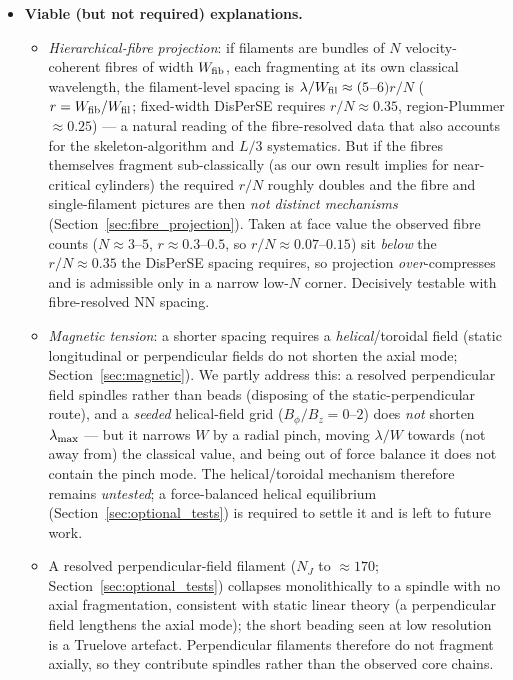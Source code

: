 \documentclass[usenatbib,twoside,twocolumn]{mnras}
\begin{document}
\begin{itemize}
    \item \textbf{Viable (but not required) explanations.}
    \begin{itemize}
        \item \emph{Hierarchical-fibre projection}: if filaments are bundles of $N$ velocity-coherent fibres of width $W_{\rm fib}$, each fragmenting at its own classical wavelength, the filament-level spacing is $\lambda/W_{\rm fil}\approx(5$--$6)r/N$ ($r=W_{\rm fib}/W_{\rm fil}$; fixed-width DisPerSE requires $r/N\approx0.35$, region-Plummer $\approx0.25$) --- a natural reading of the fibre-resolved data \citep{Yang2024,Hacar2013} that also accounts for the skeleton-algorithm and $L/3$ systematics. But if the fibres themselves fragment sub-classically (as our own result implies for near-critical cylinders) the required $r/N$ roughly doubles and the fibre and single-filament pictures are then \emph{not distinct mechanisms} (Section~\ref{sec:fibre_projection}). Taken at face value the observed fibre counts ($N\approx3$--$5$, $r\approx0.3$--$0.5$, so $r/N\approx0.07$--$0.15$) sit \emph{below} the $r/N\approx0.35$ the DisPerSE spacing requires, so projection \emph{over}-compresses and is admissible only in a narrow low-$N$ corner. Decisively testable with fibre-resolved NN spacing.
        \item \emph{Magnetic tension}: a shorter spacing requires a \emph{helical}/toroidal field \citep{Fiege2000} (static longitudinal or perpendicular fields do not shorten the axial mode; Section~\ref{sec:magnetic}). We partly address this: a resolved perpendicular field spindles rather than beads (disposing of the static-perpendicular route), and a \emph{seeded} helical-field grid ($B_\phi/B_z=0$--$2$) does \emph{not} shorten $\lambda_{\rm max}$ --- but it narrows $W$ by a radial pinch, moving $\lambda/W$ towards (not away from) the classical value, and being out of force balance it does not contain the \citet{Fiege2000} pinch mode. The helical/toroidal mechanism therefore remains \emph{untested}; a force-balanced helical equilibrium (Section~\ref{sec:optional_tests}) is required to settle it and is left to future work.
        \item A resolved perpendicular-field filament ($N_J$ to $\approx170$; Section~\ref{sec:optional_tests}) collapses monolithically to a spindle with no axial fragmentation, consistent with static linear theory (a perpendicular field lengthens the axial mode); the short beading seen at low resolution is a Truelove artefact. Perpendicular filaments therefore do not fragment axially, so they contribute spindles rather than the observed core chains.
    \end{itemize}


\end{itemize}
\end{document}
